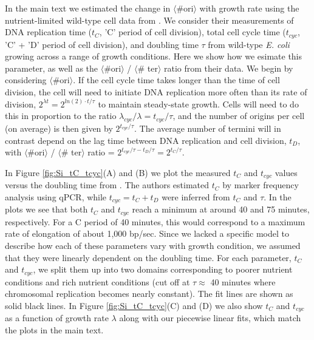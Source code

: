 In the main text we estimated the change in $\langle$\#ori$\rangle$ with growth
rate using the nutrient-limited wild-type cell data from \cite{si2017}. We
consider their measurements of DNA replication time ($t_{C}$, 'C' period of
cell division), total cell cycle time ($t_{cyc}$, 'C' + 'D' period of cell
division), and doubling time $\tau$ from wild-type \textit{E. coli} growing
across a range of growth conditions. Here we show how we  esimate this
parameter, as well as the $\langle$\#ori$\rangle$ / $\langle$\# ter$\rangle$
ratio from their data.  We begin by considering $\langle$\#ori$\rangle$. If the
cell cycle time takes longer  than the time of cell division, the cell will need
to initiate DNA replication  more often than its rate of division, $2^{\lambda
t} = 2^{ln(2) \cdot t/ \tau}$ to maintain steady-state growth. Cells will need
to do this in proportion to the ratio $\lambda_{cyc} / \lambda =  t_{cyc}/\tau$,
and the number of origins per cell (on average) is then given by $2^{t_{cyc}/
\tau}$.   The average number of termini will in contrast depend on the lag time
between  DNA replication and cell division, $t_{D}$, with
$\langle$\#ori$\rangle$ / $\langle$\# ter$\rangle$ ratio = $2^{t_{cyc}/ \tau -
t_{D}/ \tau} =  2^{t_{C}/ \tau}$.

In Figure \ref{fig:Si_tC_tcyc}(A) and (B) we plot the measured $t_{C}$ and $t_{cyc}$
values versus the doubling time from \cite{si2017}. The authors estimated
$t_{C}$ by marker frequency analysis using qPCR, while  $t_{cyc} = t_{C} +
t_{D}$ were inferred from $t_{C}$ and $\tau$. In the plots we see that both
$t_{C}$ and $t_{cyc}$ reach a minimum  at around 40 and 75 minutes,
respectively. For a C period of 40 minutes, this would correspond to a maximum
rate of elongation of about 1,000 bp/sec. Since we lacked a specific model to
describe how each of these parameters vary with growth condition, we assumed
that they were linearly dependent on the doubling time. For each parameter,
$t_{C}$ and $t_{cyc}$, we split them up into two domains corresponding to poorer
nutrient conditions and rich nutrient conditions (cut off at $\tau \approx$ 40
minutes where chromosomal replication becomes nearly constant). The fit lines
are shown as solid black lines. In Figure \ref{fig:Si_tC_tcyc}(C) and (D) we also
show $t_{C}$ and $t_{cyc}$ as a function of growth rate $\lambda$ along with our
piecewise linear fits, which match the plots in the main text.


